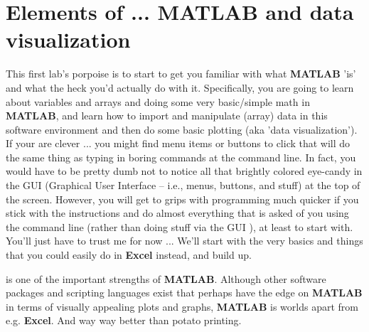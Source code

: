 \documentclass{tufte-book} %
\begin{document}
\mainmatter


\chapter{Elements of ... MATLAB and data visualization}
\label{ch:01}


\begin{fullwidth}

 This first lab's porpoise is to start to get you familiar with what \textbf{MATLAB} 'is' and what the heck you'd actually do with it. Specifically, you are going to learn about variables and arrays and  doing some very basic/simple math in \textbf{MATLAB}, and learn how to import and manipulate (array) data in this software environment and then do some basic plotting (aka 'data visualization'). If your are clever ... you might find menu items or buttons to click that will do the same thing as typing in boring commands at the command line. In fact, you would have to be pretty dumb not to notice all that brightly colored eye-candy in the GUI (Graphical User Interface -- i.e., menus, buttons, and stuff) at the top of  the screen. However, you will get to grips with programming much quicker if you stick with the instructions and do almost everything that is asked of you using the command line  (rather than doing stuff via the GUI ), at least to start with. You'll just have to trust me for now ... We'll start with the very basics and things that you could easily do in \textbf{Excel} instead, and build up.

 is one of the important strengths of \textbf{MATLAB}. Although other software packages and scripting languages exist that perhaps have the edge on \textbf{MATLAB} in terms of visually appealing plots and graphs, \textbf{MATLAB} is worlds apart from e.g. \textbf{Excel}. And way way better than potato printing.

\end{fullwidth}


\newpage

\end{document}
